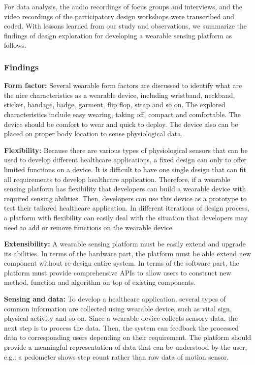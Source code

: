 For data analysis, the audio recordings of focus groups and interviews, and the video recordings of the participatory design workshops were transcribed and coded.
With lessons learned from our study and observations, we summarize the findings of design exploration for developing a wearable sensing platform as follows.

\subsubsection{Findings}
\textbf{Form factor:}
\newline
Several wearable form factors are discussed to identify what are the nice characteristics as a wearable device, including wristband, neckband, sticker, bandage, badge, garment, flip flop, strap and so on. The explored characteristics include easy wearing, taking off, compact and comfortable. The device should be comfort to wear and quick to deploy. The device also can be placed on proper body location to sense physiological data.

\vspace{10pt}
\textbf{Flexibility:}
\newline
Because there are various types of physiological sensors that can be used to develop different healthcare applications, a fixed design can only to offer limited functions on a device. It is difficult to have one single design that can fit all requirements to develop healthcare application. Therefore, if a wearable sensing platform has flexibility that developers can build a wearable device with required sensing abilities. Then, developers can use this device as a prototype to test their tailored healthcare application. In different iterations of design process, a platform with flexibility can easily deal with the situation that developers may need to add or remove functions on the wearable device.

\vspace{10pt}
\textbf{Extensibility:}
\newline
A wearable sensing platform must be easily extend and upgrade its abilities. In terms of the hardware part, the platform must be able extend new component without re-design entire system. In terms of the software part, the platform must provide comprehensive APIs to allow users to construct new method, function and algorithm on top of existing components.

\vspace{10pt}
\textbf{Sensing and data:}
\newline
To develop a healthcare application, several types of common information are collected using wearable device, such as vital sign, physical activity and so on. Since a wearable device collects sensory data, the next step is to process the data. Then, the system can feedback the processed data to corresponding users depending on their requirement. The platform should provide a meaningful representation of data that can be understood by the user, e.g.: a pedometer shows step count rather than raw data of motion sensor.

